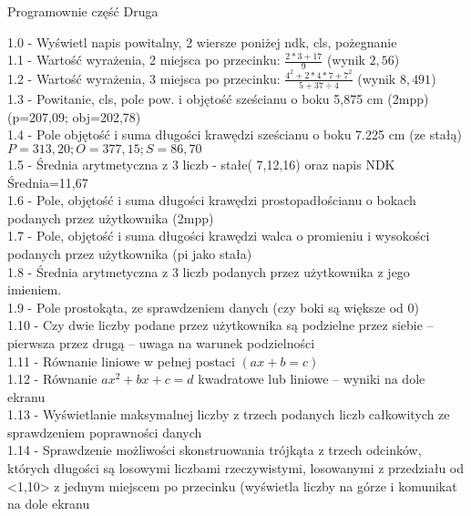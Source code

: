 \documentclass[a4paper,11pt]{article}
\begin{document}
\begin{center}
\large{Programownie część Druga}\\

\begin{itemize}[ label={}]
    \normalsize{\item{
    {1.0 - Wyświetl napis powitalny, 2 wiersze poniżej ndk, cls, pożegnanie}{} \\
    {1.1 - Wartość wyrażenia, 2 miejsca po przecinku: $\frac{2*3+17}{9}$ (wynik $2,56$) }{}\\
    {1.2 - Wartość wyrażenia, 3 miejsca po przecinku: $\frac{4^2+2*4*7+7^2}{5+37\div4}$ (wynik $8,491$) }{} \\
    {1.3 - Powitanie, cls, pole pow. i objętość sześcianu o boku 5,875 cm (2mpp) (p=207,09; obj=202,78) \\
    {1.4 - Pole objętość i suma długości krawędzi sześcianu o boku 7.225 cm (ze stałą)
$P=313,20; O=377,15; S=86,70$}{} \\
    {1.5 - Średnia arytmetyczna z 3 liczb - stałe( 7,12,16) oraz napis NDK
Średnia=11,67}{} \\
    {1.6 - Pole, objętość i suma długości krawędzi prostopadłościanu o bokach podanych
przez użytkownika (2mpp) }{} \\
    {1.7 - Pole, objętość i suma długości krawędzi walca o promieniu i wysokości podanych
przez użytkownika (pi jako stała)}{} \\
    {1.8 - Średnia arytmetyczna z 3 liczb podanych przez użytkownika z jego imieniem.}{} \\
    {1.9 - Pole prostokąta, ze sprawdzeniem danych (czy boki są większe od 0)}{} \\
    {1.10 - Czy dwie liczby podane przez użytkownika są podzielne przez siebie – pierwsza
przez drugą – uwaga na warunek podzielności}{} \\
    {1.11 - Równanie liniowe w pełnej postaci $(ax+b=c)$}{}\\
    {1.12 - Równanie $ax^2+bx+c=d$ kwadratowe lub liniowe – wyniki na dole ekranu}{}\\
    {1.13 - Wyświetlanie maksymalnej liczby z trzech podanych liczb całkowitych ze sprawdzeniem poprawności danych}{}\\
    {1.14 - Sprawdzenie możliwości skonstruowania trójkąta z trzech odcinków, których długości są losowymi liczbami rzeczywistymi, losowanymi z przedziału od <1,10> z jednym miejscem po przecinku (wyświetla liczby na górze i komunikat na dole ekranu}{}\\
}}}
\end{itemize}

\end{center}
\end{document}
